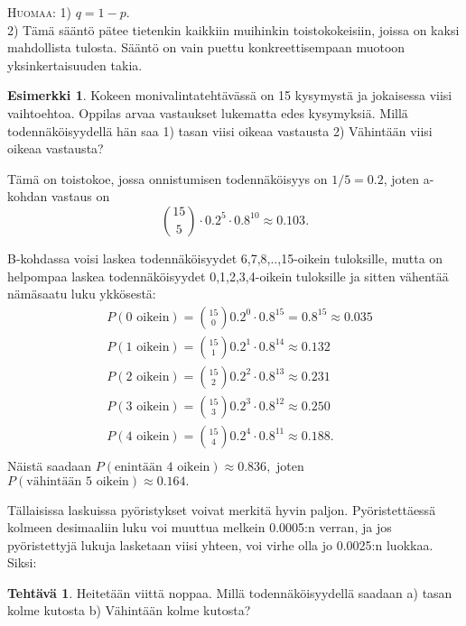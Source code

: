 \documentclass[12pt,leqno,a4paper,oneside]{amsart}
\theoremstyle{definition}
\newtheorem{example}[proclaim]{Esimerkki}
\newtheorem{exercise}{Tehtävä}
\theoremstyle{remark}
\numberwithin{equation}{section}
\begin{document}
\textsc{Huomaa:} 1) $q=1-p$.\\
2) Tämä sääntö pätee tietenkin kaikkiin muihinkin toistokokeisiin, joissa on kaksi mahdollista tulosta. Sääntö on vain puettu konkreettisempaan
muotoon yksinkertaisuuden takia.

\begin{example}
 Kokeen monivalintatehtävässä on 15 kysymystä ja jokaisessa viisi vaihtoehtoa. Oppilas arvaa vastaukset lukematta edes kysymyksiä. Millä todennäköisyydellä
 hän saa 1) tasan viisi oikeaa vastausta 2) Vähintään viisi oikeaa vastausta?
 
 Tämä on toistokoe, jossa onnistumisen todennäköisyys on $1/5 = 0.2$, joten a-kohdan vastaus on
 $${15\choose 5} \cdot 0.2^5 \cdot0.8^{10} \approx 0.103.$$
 
 B-kohdassa voisi laskea todennäköisyydet 6,7,8,..,15-oikein tuloksille, mutta on helpompaa laskea todennäköisyydet 0,1,2,3,4-oikein tuloksille ja sitten vähentää
 nämäsaatu luku ykkösestä:
 \begin{align*}
  &P(0\text{ oikein}) = {15\choose 0} 0.2^0 \cdot 0.8^{15} = 0.8^15 \approx 0.035\\
  &P(1\text{ oikein}) = {15\choose 1} 0.2^1 \cdot 0.8^{14} \approx 0.132\\
  &P(2\text{ oikein}) = {15\choose 2} 0.2^2 \cdot 0.8^{13} \approx 0.231\\
  &P(3\text{ oikein}) = {15\choose 3} 0.2^3 \cdot 0.8^{12} \approx 0.250\\
  &P(4\text{ oikein}) = {15\choose 4} 0.2^4 \cdot 0.8^{11} \approx 0.188.\\
 \end{align*}
 Näistä saadaan $P(\text{enintään } 4 \text{ oikein})\approx 0.836,$ joten $P(\text{vähintään } 5 \text{ oikein})\approx 0.164.$
\end{example}

 Tällaisissa laskuissa pyöristykset voivat merkitä hyvin paljon. Pyöristettäessä kolmeen desimaaliin luku voi muuttua
 melkein 0.0005:n verran, ja jos pyöristettyjä lukuja lasketaan viisi yhteen, voi virhe olla jo 0.0025:n luokkaa. Siksi:
 \begin{center}
 \end{center}

\begin{exercise}
 Heitetään viittä noppaa. Millä todennäköisyydellä saadaan a) tasan kolme kutosta b) Vähintään kolme kutosta?
\end{exercise}
\end{document}

